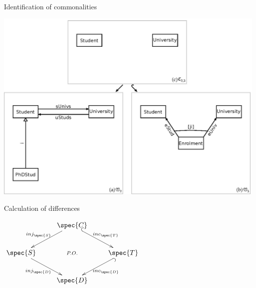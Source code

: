 \documentclass[dvips,slidetop,mathserif,brown]{beamer}
\begin{document}
\begin{frame}{Identification of commonalities}
  \begin{center}
    \includegraphics[scale=0.4]{ex_project_vc_standard_common}
  \end{center}
\end{frame}

\begin{frame}{Calculation of differences}
  \begin{center}
    $\xymatrix{
      & \spec{C} \ar@{^{(}->}[dr]^-{inc_{\spec{T}}} \ar@{}[dd]|-{P.O.} \ar[dl]_-{inj_{\spec{S}}} \\
      \spec{S} \ar[dr]_-{inj_{\spec{D}}} & & \spec{T} \ar@{^{(}->}[dl]^-{inc_{\spec{D}}} \\
      & \spec{D}
    }$
  \end{center}
\end{frame}
\end{document}
